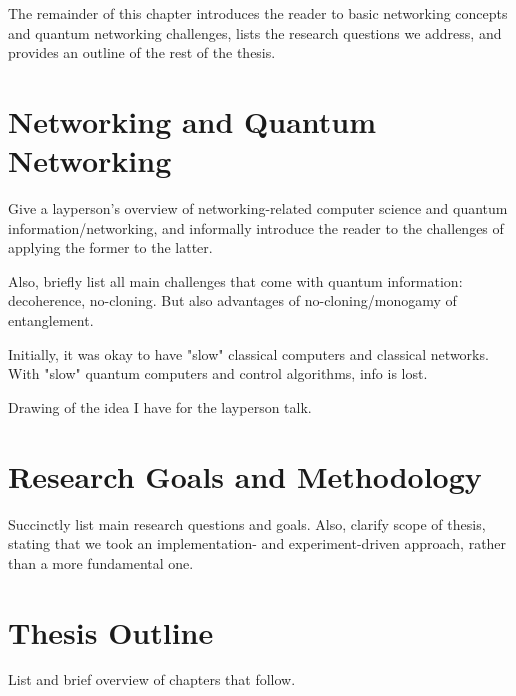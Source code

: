 \begin{refsection}
The remainder of this chapter introduces the reader to basic networking concepts and quantum
networking challenges, lists the research questions we address, and provides an outline of the rest
of the thesis.

\section{Networking and Quantum Networking}

Give a layperson's overview of networking-related computer science and quantum
information/networking, and informally introduce the reader to the challenges of applying the former
to the latter.

Also, briefly list all main challenges that come with quantum information: decoherence, no-cloning.
But also advantages of no-cloning/monogamy of entanglement.

Initially, it was okay to have "slow" classical computers and classical networks. With "slow"
quantum computers and control algorithms, info is lost.

Drawing of the idea I have for the layperson talk.

\section{Research Goals and Methodology}

Succinctly list main research questions and goals. Also, clarify scope of thesis, stating that we
took an implementation- and experiment-driven approach, rather than a more fundamental one.

\section{Thesis Outline}

List and brief overview of chapters that follow.

\printbibliography[heading=subbibintoc,title={References}]

\end{refsection}
